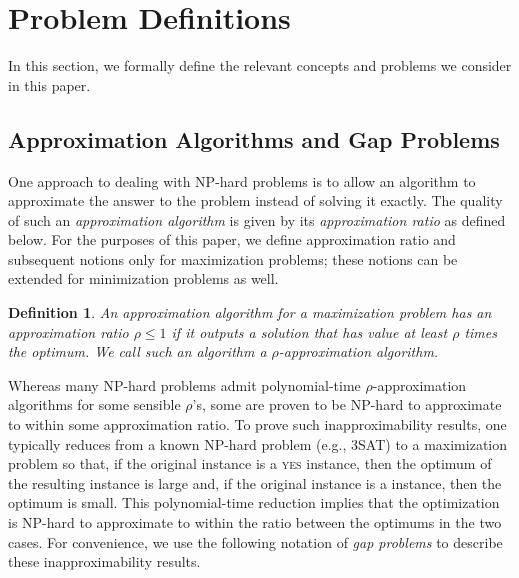 \documentclass[11pt]{article}
\newtheorem{definition}{Definition}
\begin{document}
\section{Problem Definitions}

In this section, we formally define the relevant concepts and problems we
consider in this paper.

\subsection{Approximation Algorithms and Gap Problems}

One approach to dealing with NP-hard problems is to allow an algorithm to approximate the answer to the problem instead of solving it exactly. The quality of such an \emph{approximation algorithm} is given by its \emph{approximation ratio} as defined below. For the purposes of this paper, we define approximation ratio and subsequent notions only for maximization problems; these notions can be extended for minimization problems as well.

\begin{definition}
An approximation algorithm for a maximization problem has an \emph{approximation ratio} $\rho \leq 1$ if it outputs a solution that has value at least $\rho$ times the optimum.
We call such an algorithm a \emph{$\rho$-approximation algorithm}.
\end{definition}

Whereas many NP-hard problems admit polynomial-time $\rho$-approximation algorithms for some sensible $\rho$'s, some are proven to be NP-hard to approximate to within some approximation ratio. To prove such inapproximability results, one typically reduces from a known NP-hard problem (e.g., \textsc{3SAT}) to a maximization problem so that, if the original instance is a \textsc{yes} instance, then the optimum of the resulting instance is large and, if the original instance is a  instance, then the optimum is small. This polynomial-time reduction implies that the optimization is NP-hard to approximate to within the ratio between the optimums in the two cases. For convenience, we use the following notation of \emph{gap problems} to describe these inapproximability results.
\end{document}
